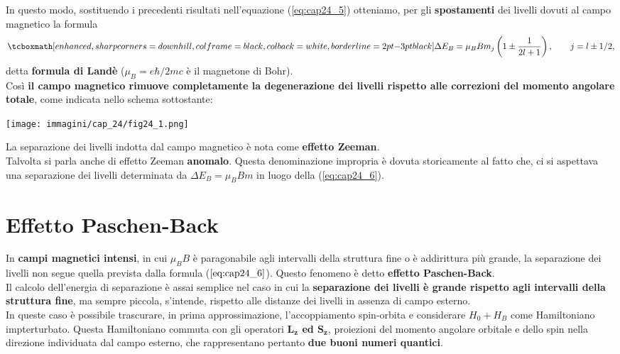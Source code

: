 In questo modo, sostituendo i precedenti risultati nell'equazione (\ref{eq:cap24_5}) otteniamo, per gli \textbf{spostamenti} dei livelli dovuti al campo magnetico la formula
	\begin{equation}
	\label{eq:cap24_6}
		\tcboxmath[enhanced, sharp corners=downhill, colframe=black, colback=white, borderline={2pt}{-3pt}{black}]{
			\Delta E_B= \mu_B B m_j \left( 1\pm \frac{1}{2l+1}\right), \qquad j=l\pm 1/2 ,
			}
	\end{equation}
detta \textbf{formula di Landè} ($\mu_B=e\hbar /2mc$ è il magnetone di Bohr).\\

Così \textbf{il campo magnetico rimuove completamente la degenerazione dei livelli rispetto alle correzioni del momento angolare totale}, come indicata nello schema sottostante: 
\begin{center}
\begin{tcolorbox}[sharp corners=downhill, width=.9\textwidth, colframe=black, colback=white]
\texttt{[image: immagini/cap\_24/fig24\_1.png]}
\end{tcolorbox}
\end{center}

La separazione dei livelli indotta dal campo magnetico è nota come \textbf{effetto Zeeman}. \\

Talvolta si parla anche di effetto Zeeman \textbf{anomalo}. Questa denominazione impropria è dovuta storicamente al fatto che, ci si aspettava una separazione dei livelli determinata da $\Delta E_B=\mu_BBm$ in luogo della (\ref{eq:cap24_6}).

\section{Effetto Paschen-Back}
In \textbf{campi magnetici intensi}, in cui $\mu_B B$ è paragonabile agli intervalli della struttura fine o è addirittura più grande, la separazione dei livelli non segue quella prevista dalla formula ($\ref{eq:cap24_6}$). Questo fenomeno è detto \textbf{effetto Paschen-Back}. \\

Il calcolo dell'energia di separazione è assai semplice nel caso in cui la \textbf{separazione dei livelli è grande rispetto agli intervalli della struttura fine}, ma sempre piccola, s'intende, rispetto alle distanze dei livelli in assenza di campo esterno. \\

In queste caso è possibile trascurare, in prima approssimazione, l'accoppiamento spin-orbita e considerare $ H_0+H_B $ come Hamiltoniano impterturbato. Questa Hamiltoniano commuta con gli operatori \textbf{$\boldsymbol{L_z}$ ed $\boldsymbol{S_z}$}, proiezioni del momento angolare orbitale e dello spin nella direzione individuata dal campo esterno, che rappresentano pertanto \textbf{due buoni numeri quantici}. \\

